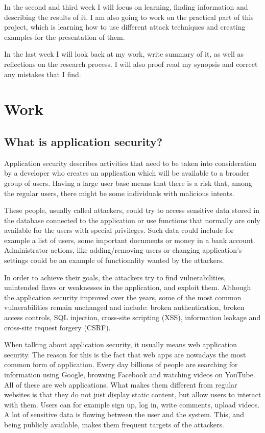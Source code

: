 \documentclass[a4paper]{article}
\begin{document}
In the second and third week I will focus on learning, finding information and
describing the results of it. I am also going to work on the practical part of
this project, which is learning how to use different attack techniques and
creating examples for the presentation of them.

In the last week I will look back at my work, write summary of it, as well as
reflections on the research process. I will also proof read my synopsis and
correct any mistakes that I find.

\newpage

\section{Work}

\subsection{What is application security?}

Application security describes activities that need to be taken into
consideration by a developer who creates an application which will be available
to a broader group of users. Having a large user base means that there is a risk
that, among the regular users, there might be some individuals with malicious
intents.

These people, usually called attackers, could try to access sensitive data
stored in the database connected to the application or use functions that
normally are only available for the users with special privileges. Such data
could include for example a list of users, some important documents or money in
a bank account. Administrator actions, like adding/removing users or changing
application's settings could be an example of functionality wanted by the
attackers.

In order to achieve their goals, the attackers try to find vulnerabilities,
unintended flaws or weaknesses in the application, and exploit them. Although
the application security improved over the years, some of the most common
vulnerabilities remain unchanged and include: broken authentication, broken
access controls, SQL injection, cross-site scripting (XSS), information leakage
and cross-site request forgery (CSRF).

When talking about application security, it usually means web application
security. The reason for this is the fact that web apps are nowadays the most
common form of application. Every day billions of people are searching for
information using Google, browsing Facebook and watching videos on YouTube. All
of these are web applications. What makes them different from regular websites
is that they do not just display static content, but allow users to interact
with them. Users can for example sign up, log in, write comments, upload videos.
A lot of sensitive data is flowing between the user and the system. This, and
being publicly available, makes them frequent targets of the attackers.
\end{document}
